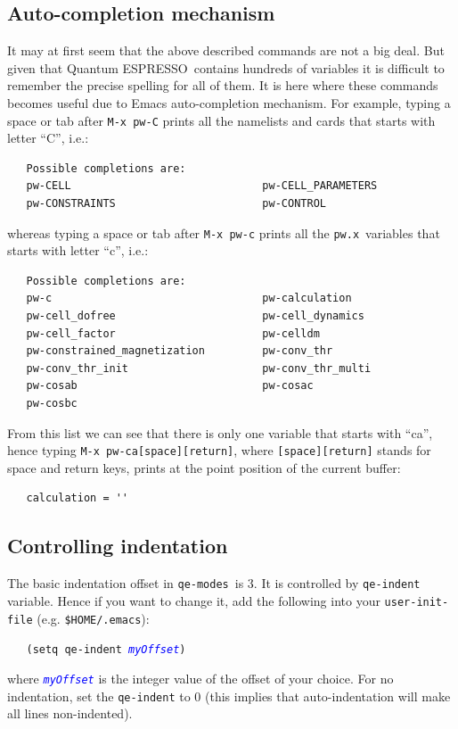 \documentclass[12pt,a4paper]{article}
\def\qe{{\sc Quantum ESPRESSO}}
\def\pwx{\texttt{pw.x}}
\def\qemodes{\texttt{qe-modes}}
\def\var#1{\textcolor{Blue}{\texttt{\textit{#1}}}}
\begin{document}
\subsection{Auto-completion mechanism}
It may at first seem that the above described commands are not a big
deal. But given that \qe\ contains hundreds of variables it is
difficult to remember the precise spelling for all of them. It is here
where these commands becomes useful due to Emacs auto-completion
mechanism. For example, typing a space or tab after \texttt{M-x pw-C} 
prints all the namelists and cards that starts with letter ``C'', i.e.:
\begin{verbatim}
   Possible completions are:
   pw-CELL                              pw-CELL_PARAMETERS
   pw-CONSTRAINTS                       pw-CONTROL
\end{verbatim}
\noindent whereas typing a space or tab after \texttt{M-x pw-c}
prints all the \pwx\ variables that starts with letter ``c'', i.e.:
\begin{verbatim}
   Possible completions are:
   pw-c                                 pw-calculation
   pw-cell_dofree                       pw-cell_dynamics
   pw-cell_factor                       pw-celldm
   pw-constrained_magnetization         pw-conv_thr
   pw-conv_thr_init                     pw-conv_thr_multi
   pw-cosab                             pw-cosac
   pw-cosbc
\end{verbatim}
\noindent
From this list we can see that there is only one variable that starts
with ``ca'', hence typing \texttt{M-x pw-ca[space][return]}, where
\texttt{[space][return]} stands for space and return keys, prints at
the point position of the current buffer:
\begin{verbatim}
   calculation = ''
\end{verbatim}

\subsection{Controlling indentation}

The basic indentation offset in \qemodes\ is 3. It is controlled by
\texttt{qe-indent} variable. Hence if you want to change it, add the
following into your \texttt{user-init-file}
(e.g. \texttt{\$HOME/.emacs}):
\begin{flushleft}
\verb+   (setq qe-indent +\var{myOffset}\verb+)+
\end{flushleft}
where \var{myOffset} is the integer value of the offset of your
choice. For no indentation, set the \texttt{qe-indent} to 0 (this
implies that auto-indentation will make all lines non-indented).
\end{document}
